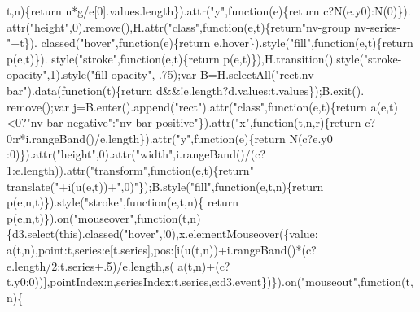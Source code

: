 \begin{DoxyCode}
{      t,n)\{\textcolor{keywordflow}{return} n*g/e[0].values.length\}).attr(\textcolor{stringliteral}{"y"},\textcolor{keyword}{function}(e)\{\textcolor{keywordflow}{return} c?N(e.y0):N(0)\}).
      attr(\textcolor{stringliteral}{"height"},0).remove(),H.attr(\textcolor{stringliteral}{"class"},function(e,t)\{\textcolor{keywordflow}{return}\textcolor{stringliteral}{"nv-group nv-series-"}+t\}).
      classed(\textcolor{stringliteral}{"hover"},\textcolor{keyword}{function}(e)\{\textcolor{keywordflow}{return} e.hover\}).style(\textcolor{stringliteral}{"fill"},\textcolor{keyword}{function}(e,t)\{\textcolor{keywordflow}{return} p(e,t)\}).
      style(\textcolor{stringliteral}{"stroke"},\textcolor{keyword}{function}(e,t)\{\textcolor{keywordflow}{return} p(e,t)\}),H.transition().style(\textcolor{stringliteral}{"stroke-opacity"},1).style(\textcolor{stringliteral}{"fill-opacity"},
      .75);var B=H.selectAll(\textcolor{stringliteral}{"rect.nv-bar"}).data(\textcolor{keyword}{function}(t)\{\textcolor{keywordflow}{return} d&&!e.length?d.values:t.values\});B.exit().
      remove();var j=B.enter().append(\textcolor{stringliteral}{"rect"}).attr(\textcolor{stringliteral}{"class"},\textcolor{keyword}{function}(e,t)\{\textcolor{keywordflow}{return} a(e,t)<0?\textcolor{stringliteral}{"nv-bar negative"}:\textcolor{stringliteral}{"nv-bar
       positive"}\}).attr(\textcolor{stringliteral}{"x"},\textcolor{keyword}{function}(t,n,r)\{\textcolor{keywordflow}{return} c?0:r*i.rangeBand()/e.length\}).attr(\textcolor{stringliteral}{"y"},\textcolor{keyword}{function}(e)\{\textcolor{keywordflow}{return} N(c?e.y0
      :0)\}).attr(\textcolor{stringliteral}{"height"},0).attr(\textcolor{stringliteral}{"width"},i.rangeBand()/(c?1:e.length)).attr(\textcolor{stringliteral}{"transform"},\textcolor{keyword}{function}(e,t)\{\textcolor{keywordflow}{return}\textcolor{stringliteral}{"
      translate("}+i(u(e,t))+\textcolor{stringliteral}{",0)"}\});B.style(\textcolor{stringliteral}{"fill"},\textcolor{keyword}{function}(e,t,n)\{\textcolor{keywordflow}{return} p(e,n,t)\}).style(\textcolor{stringliteral}{"stroke"},\textcolor{keyword}{function}(e,t,n)\{\textcolor{keywordflow}{
      return} p(e,n,t)\}).on(\textcolor{stringliteral}{"mouseover"},\textcolor{keyword}{function}(t,n)\{d3.select(\textcolor{keyword}{this}).classed(\textcolor{stringliteral}{"hover"},!0),x.elementMouseover(\{value:
      a(t,n),point:t,series:e[t.series],pos:[i(u(t,n))+i.rangeBand()*(c?e.length/2:t.series+.5)/e.length,s(
      a(t,n)+(c?t.y0:0))],pointIndex:n,seriesIndex:t.series,e:d3.event\})\}).on(\textcolor{stringliteral}{"mouseout"},\textcolor{keyword}{function}(t,n)\{
}
\end{DoxyCode}
